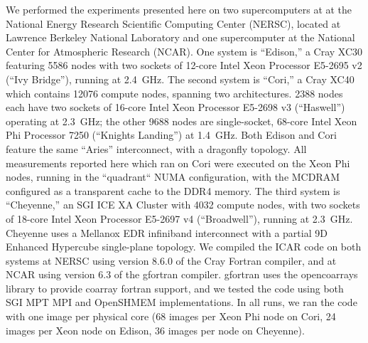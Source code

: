 We performed the experiments presented here on two supercomputers at at the National Energy Research Scientific Computing Center (NERSC), 
located at Lawrence Berkeley National Laboratory and one supercomputer at the National Center for Atmospheric Research (NCAR). 
One system is ``Edison,'' a Cray XC30 featuring 5586 nodes with two sockets of 12-core Intel Xeon Processor E5-2695 v2 (``Ivy Bridge''), running at \num{2.4}~\si{\giga\hertz}.
The second system is ``Cori,'' a Cray XC40 which contains \num{12076} compute nodes, spanning two architectures. \num{2388} nodes each have two sockets of 16-core Intel Xeon Processor E5-2698 v3 (``Haswell'') operating at \num{2.3}~\si{\giga\hertz}; the other \num{9688} nodes are single-socket, 68-core Intel Xeon Phi Processor 7250 (``Knights Landing'') at \num{1.4}~\si{\giga\hertz}.
Both Edison and Cori feature the same ``Aries'' interconnect, with a dragonfly topology.
All measurements reported here which ran on Cori were executed on the Xeon Phi nodes, running in the ``quadrant`` NUMA configuration, with the MCDRAM configured as a transparent cache to the DDR4 memory.
The third system is ``Cheyenne,'' an SGI ICE XA Cluster with \num{4032} compute nodes, with two sockets of 18-core Intel Xeon Processor E5-2697 v4 (``Broadwell''), running at \num{2.3}~\si{\giga\hertz}.
Cheyenne uses a Mellanox EDR infiniband interconnect with a partial 9D Enhanced Hypercube single-plane topology. 
We compiled the ICAR code on both systems at NERSC using version 8.6.0 of the Cray Fortran compiler, and at NCAR using version 6.3 of the gfortran compiler. 
gfortran uses the opencoarrays library to provide coarray fortran support, and we tested the code using both SGI MPT MPI and OpenSHMEM implementations. 
In all runs, we ran the code with one image per physical core (68 images per Xeon Phi node on Cori, 24 images per Xeon node on Edison, 36 images per node on Cheyenne).

